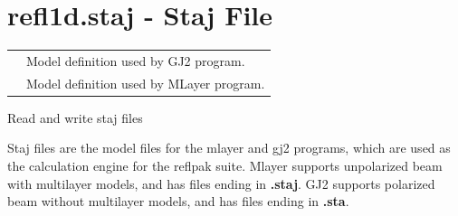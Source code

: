 \documentclass[letterpaper,10pt,english]{sphinxmanual}
\begin{document}
\section{refl1d.staj - Staj File}
\label{api/staj::doc}\label{api/staj:refl1d-staj-staj-file}
\begin{tabulary}{\linewidth}{LL}
\hline

{\hyperref[api/staj:refl1d.staj.MlayerMagnetic]{}}
 & 
Model definition used by GJ2 program.
\\

{\hyperref[api/staj:refl1d.staj.MlayerModel]{}}
 & 
Model definition used by MLayer program.
\\
\hline
\end{tabulary}

\label{api/staj:module-refl1d.staj}
Read and write staj files

Staj files are the model files for the mlayer and gj2 programs, which are
used as the calculation engine for the reflpak suite. Mlayer supports
unpolarized beam with multilayer models,  and has files ending in
\textbf{.staj}. GJ2 supports polarized beam without multilayer models, and
has files ending in \textbf{.sta}.
\end{document}

